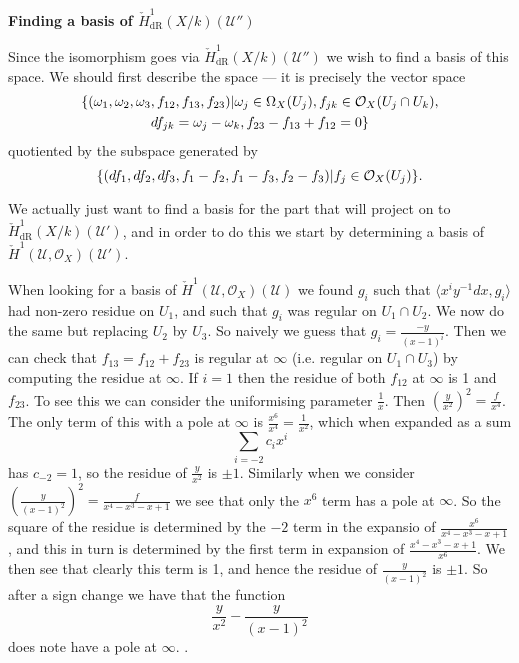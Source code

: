 \documentclass[draft, 11pt]{article} %
\theoremstyle{plain}
\theoremstyle{remark}
\newcommand{\cO}{{\cal O}}
\newcommand{\cU}{{\mathcal U}}
\newcommand{\cechhone}{\check{H}^1(\mathcal U,\mathcal O_X)}
\newcommand{\cechderhamhone}{\check{H}_{\text {dR}}^1(X/k)}
\begin{document}
{\bf Finding a basis of $\cechderhamhone (\cU '')$}

Since the isomorphism goes via $\cechderhamhone (\cU'')$ we wish to find a basis of this space.
We should first describe the space --- it is precisely the vector space
\begin{multline}\label{u''conditions}
\{ ( \omega_1, \omega_2, \omega_3, f_{12}, f_{13}, f_{23}) | \omega_j \in \Omega_X(U_j), f_{jk} \in \cO_X(U_j \cap U_k),\\ df_{jk} = \omega_j - \omega_k, f_{23} - f_{13} + f_{12} = 0\}
\end{multline}
quotiented by the subspace generated by
\begin{equation*}
\{ (df_1, df_2, df_3, f_1-f_2, f_1-f_3, f_2-f_3) | f_j \in \cO_X(U_j) \}.
\end{equation*}

We actually just want to find a basis for the part that will project on to $\cechderhamhone (\cU')$, and in order to do this we start by determining a basis of $\cechhone (\cU')$.

When looking for a basis of $\cechhone (\cU)$ we found $g_i$ such that $\langle x^iy^{-1}dx, g_i \rangle$ had non-zero residue on $U_1$, and such that $g_i$ was regular on $U_1 \cap U_2$.
We now do the same but replacing $U_2$ by $U_3$.
So naively we guess that $g_i = \frac{-y}{(x-1)^i}$.
Then we can check that $f_{13} = f_{12} + f_{23}$ is regular at $\infty$ (i.e. regular on $U_1 \cap U_3$) by computing the residue at $\infty$.
If $i = 1$ then the residue of both $f_{12}$  at $\infty$ is 1 and $f_{23}$.
To see this we can consider the uniformising parameter $\frac{1}{x}$.
Then $\left( \frac{y}{x^2} \right)^2 = \frac{f}{x^4}$.
The only term of this with a pole at $\infty$ is $\frac{x^6}{x^4}= \frac{1}{x^2}$, which when expanded as a sum
\[
\sum_{i=-2} c_i x^i
\]
has $c_{-2} = 1$, so the residue of $\frac{y}{x^2}$ is $\pm 1$.
Similarly when we consider $\left( \frac{y}{(x-1)^2} \right)^2 = \frac{f}{x^4 - x^3 - x +1}$ we see that only the $x^6$ term has a pole at $\infty$.
So the square of the residue is determined by the $-2$ term in the expansio of $\frac{x^6}{x^4 - x^3 - x +1}$, and this in turn is determined by the first term in expansion of $\frac{x^4 - x^3 - x +1}{x^6}$. 
We then see that clearly this term is 1, and hence the residue of $\frac{y}{(x-1)^2}$ is $\pm 1$.
So after a sign change we have that the function 
\[
\frac{y}{x^2}  - \frac{y}{(x-1)^2}
\]
does note have a pole at $\infty$.
.
\end{document}
